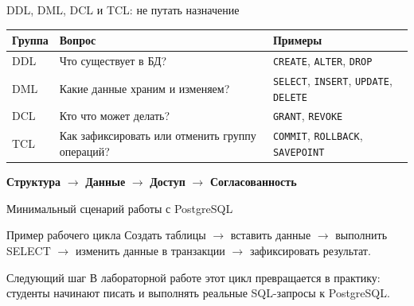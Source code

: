 \documentclass[aspectratio=169]{beamer}
\begin{document}
\begin{frame}{DDL, DML, DCL и TCL: не путать назначение}
\small
\begin{table}
\centering
\begin{tabular}{p{}|p{}|p{}}
\toprule
\textbf{Группа} & \textbf{Вопрос} & \textbf{Примеры}\\
\midrule
DDL & Что существует в БД? & \texttt{CREATE}, \texttt{ALTER}, \texttt{DROP}\\
DML & Какие данные храним и изменяем? & \texttt{SELECT}, \texttt{INSERT}, \texttt{UPDATE}, \texttt{DELETE}\\
DCL & Кто что может делать? & \texttt{GRANT}, \texttt{REVOKE}\\
TCL & Как зафиксировать или отменить группу операций? & \texttt{COMMIT}, \texttt{ROLLBACK}, \texttt{SAVEPOINT}\\
\bottomrule
\end{tabular}
\end{table}

\vspace{0.35cm}
\begin{center}
\Large
\textbf{Структура} $\rightarrow$ \textbf{Данные} $\rightarrow$ \textbf{Доступ} $\rightarrow$ \textbf{Согласованность}
\end{center}
\end{frame}

\begin{frame}{Минимальный сценарий работы с PostgreSQL}
\begin{center}
\end{center}

\vspace{0.45cm}
\begin{block}{Пример рабочего цикла}
Создать таблицы \;$\rightarrow$\; вставить данные \;$\rightarrow$\; выполнить SELECT
\;$\rightarrow$\; изменить данные в транзакции \;$\rightarrow$\; зафиксировать результат.
\end{block}

\begin{alertblock}{Следующий шаг}
В лабораторной работе этот цикл превращается в практику: студенты начинают писать
и выполнять реальные SQL-запросы к PostgreSQL.
\end{alertblock}
\end{frame}
\end{document}
